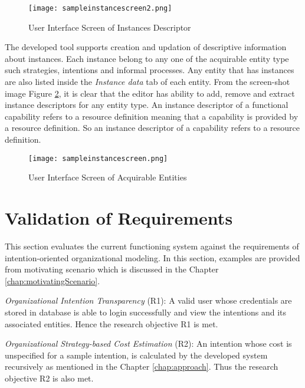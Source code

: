 \begin{figure}
	\centering
	\texttt{[image: sampleinstancescreen2.png]}
	\caption{User Interface Screen of Instances Descriptor}
	\label{fig:realizationofinstances2}
\end{figure}

The developed tool supports creation and updation of descriptive information about instances. Each instance belong to any one of the acquirable entity type such strategies, intentions and informal processes. Any entity that has instances are also listed inside the \textit{Instance data} tab of each entity. From the screen-shot image Figure \ref{fig:realizationofinstances}, it is clear that the editor has ability to add, remove and extract instance descriptors for any entity type. An instance descriptor of a functional capability refers to a resource definition meaning that a capability is provided by a resource definition. So an instance descriptor of a capability refers to a resource definition.

\begin{figure}
	\centering
	\texttt{[image: sampleinstancescreen.png]}
	\caption{User Interface Screen of Acquirable Entities}
	\label{fig:realizationofinstances}
\end{figure}

		
\section{Validation of Requirements}
\label{sec:validation}
This section evaluates the current functioning system against the requirements of intention-oriented organizational modeling. In this section, examples are provided from motivating scenario which is discussed in the Chapter \ref{chap:motivatingScenario}. 

\textit{Organizational Intention Transparency} (R1): A valid user whose credentials are stored in database is able to login successfully and view the intentions and its associated entities. Hence the research objective R1 is met.

\textit{Organizational Strategy-based Cost Estimation} (R2): An intention whose cost is unspecified for a sample intention, is calculated by the developed system recursively as mentioned in the Chapter \ref{chap:approach}. Thus the research objective R2 is also met.

